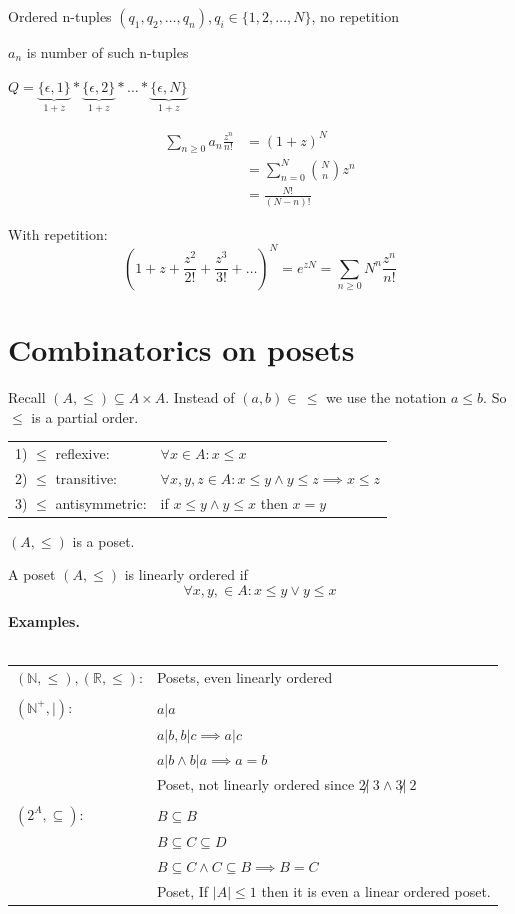 Ordered n-tuples $(q_1,q_2, \ldots, q_n), q_i \in \{1,2, \ldots, N\}$, no repetition

$a_n$ is number of such n-tuples

$Q = \underbrace{\{\epsilon,1\}}_{1+z} *
     \underbrace{\{\epsilon,2\}}_{1+z} * \ldots *
     \underbrace{\{\epsilon,N\}}_{1+z} $

\begin{align*}
  \sum_{n\geq 0} a_n \frac{z^n}{n!} &=
    (1+z)^N \\
    &= \sum_{n=0} ^{N} {N \choose n} z^n \\
    &= \frac{N!}{(N-n)!}
\end{align*}

With repetition:
\[
  (1+z+ \frac{z^2}{2!} + \frac{z^3}{3!} + \ldots)^N
    = e^{zN} = \sum_{n\geq 0} N^n \frac{z^n}{n!}
\]

\section{Combinatorics on posets}

Recall $(A, \leq) \subseteq A \times A$.
Instead of $(a,b) \in \, \leq$ we use the notation $a \leq b$. So $\leq$ is a partial order.

\begin{tabular}{ll}
  1) $\leq$ reflexive: &
    $\forall x \in A: x \leq x$ \\
  2) $\leq$ transitive:  &
    $\forall x,y,z \in A: x \leq y \land y \leq z \implies x \leq z$ \\
  3) $\leq$ antisymmetric: &
    if $x \leq y \land y \leq x$ then $x = y$ \\
\end{tabular}

$(A,\leq)$ is a poset.

A poset $(A,\leq)$ is linearly ordered if
\[
  \forall x,y, \in A: x \leq y \lor y \leq x
\]

\textbf{Examples.}\\\\
\begin{tabular}{l l}
  $(\mathbb{N}, \leq), (\mathbb{R}, \leq)$: & Posets, even linearly ordered \\\\

  $(\mathbb{N}^{+}, |)$:
    & $a|a$ \\
    & $ a|b, b|c \implies a|c$\\
    & $ a|b \land b|a \implies a = b$\\
    & Poset, not linearly ordered since $2 \not|~ 3 \land 3 \not|~ 2$\\\\

  $(2^A, \subseteq)$:
    & $ B \subseteq B$\\
    & $ B \subseteq C \subseteq D$\\
    & $ B \subseteq C \land C \subseteq B \implies B = C$ \\
    & Poset, If $|A|\leq 1$ then it is even a linear ordered poset.
\end{tabular}

